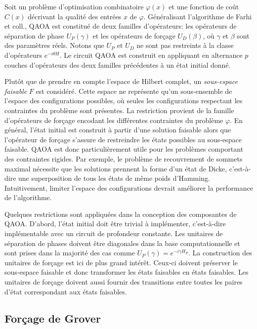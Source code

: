 Soit un problème d'optimisation combinatoire $\varphi(x)$ et une fonction de coût $C(x)$ décrivant la qualité des entrées $x$ de $\varphi$. Généralisant l'algorithme de Farhi et coll., QAOA est constitué de deux familles d'opérateurs: les opérateurs de séparation de phase $U_{P}(\gamma)$ et les opérateurs de forçage $U_{D}(\beta)$, où $\gamma$ et $\beta$ sont des paramètres réels. Notons que $U_{P}$ et $U_{D}$ ne sont pas restreints à la classe d'opérateurs $e^{-i \theta H}$. Le circuit QAOA est construit en appliquant en alternance $p$ couches d'opérateurs des deux familles précédentes à un état initial donné.
        
Plutôt que de prendre en compte l'espace de Hilbert complet, un \textit{sous-espace faisable} $F$ est considéré. Cette espace ne représente qu'un sous-ensemble de l'espace des configurations possibles, où seules les configurations respectant les contraintes du problème sont présentes. La restriction provient de la famille d'opérateurs de forçage encodant les différentes contraintes du problème $\varphi$. En général, l'état initial est construit à partir d'une solution faisable alors que l'opérateur de forçage s'assure de restreindre les états possibles au sous-espace faisable. QAOA est donc particulièrement utile pour les problèmes comportant des contraintes rigides. Par exemple, le problème de recouvrement de sommets maximal nécessite que les solutions prennent la forme d'un état de Dicke, c'est-à-dire une superposition de tous les états de même poids d'Hamming. Intuitivement, limiter l'espace des configurations devrait améliorer la performance de l'algorithme. 

Quelques restrictions sont appliquées dans la conception des composantes de QAOA. D'abord, l'état initial doit être trivial à implémenter, c'est-à-dire implémentable avec un circuit de profondeur constante. Les unitaires de séparation de phases doivent être diagonales dans la base computationnelle et sont prises dans la majorité des cas comme $U_{P}(\gamma) = e^{-i \gamma H_{P}}$. La construction des unitaires de forçage est ici de plus grand intérêt. Ceux-ci doivent préserver le sous-espace faisable et donc transformer les états faisables en états faisables. Les unitaires de forçage doivent aussi fournir des transitions entre toutes les paires d'état correspondant aux états faisables.


\subsection{Forçage de Grover}
\label{subsec:forcage-de-grover}

